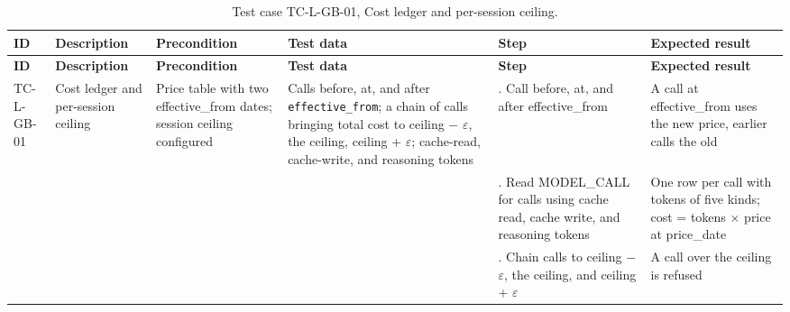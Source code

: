 {\footnotesize{}\renewcommand{\arraystretch}{1.1}
\begin{longtable}{|>{\raggedright\arraybackslash}p{}|>{\raggedright\arraybackslash}p{}|>{\raggedright\arraybackslash}p{}|>{\raggedright\arraybackslash}p{}|>{\raggedright\arraybackslash}p{}|>{\raggedright\arraybackslash}p{}|}
\caption{Test case TC-L-GB-01, Cost ledger and per-session ceiling.} \\
\hline
\textbf{ID} & \textbf{Description} & \textbf{Precondition} & \textbf{Test data} & \textbf{Step} & \textbf{Expected result} \\ \hline
\endfirsthead
\hline
\textbf{ID} & \textbf{Description} & \textbf{Precondition} & \textbf{Test data} & \textbf{Step} & \textbf{Expected result} \\ \hline
\endhead
TC-L-GB-01 & Cost ledger and per-session ceiling & Price table with two effective\_\allowbreak{}from dates; session ceiling configured & Calls before, at, and after \texttt{effective\_\allowbreak{}from}; a chain of calls bringing total cost to ceiling $-$ $\varepsilon$, the ceiling, ceiling + $\varepsilon$; cache-read, cache-\allowbreak{}write, and reasoning tokens & 1. Call before, at, and after effective\_\allowbreak{}from & A call at effective\_\allowbreak{}from uses the new price, earlier calls the old \\ \cline{5-6}
 &  &  &  & 2. Read MODEL\_CALL for calls using cache read, cache write, and reasoning tokens & One row per call with tokens of five kinds; cost = tokens $\times$ price at price\_date \\ \cline{5-6}
 &  &  &  & 3. Chain calls to ceiling $-$ $\varepsilon$, the ceiling, and ceiling + $\varepsilon$ & A call over the ceiling is refused \\ \hline
\end{longtable}
}

